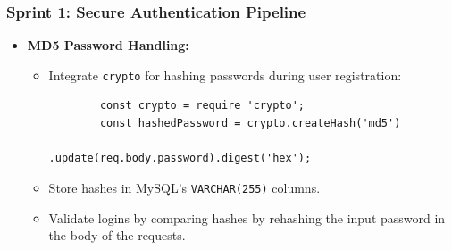 \subsubsection*{Sprint 1: Secure Authentication Pipeline}  
\begin{itemize}  
    \item \textbf{MD5 Password Handling:}  
    \begin{itemize}  
        \item Integrate \texttt{crypto} for hashing passwords during user registration:  
        \begin{verbatim}  
        const crypto = require 'crypto';  
        const hashedPassword = crypto.createHash('md5')
                            .update(req.body.password).digest('hex');
        \end{verbatim}  
        \item Store hashes in MySQL’s \texttt{VARCHAR(255)} columns.  
        \item Validate logins by comparing hashes by rehashing the input password in the body of the requests. 
    \end{itemize}  
\end{itemize}  

